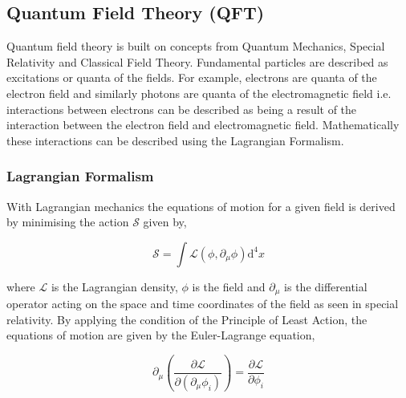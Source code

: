 \subsection{Quantum Field Theory (QFT)}

Quantum field theory is built on concepts from Quantum Mechanics, Special Relativity and Classical Field Theory. Fundamental particles are described as excitations or quanta of the fields. For example, electrons are quanta of the electron field and similarly photons are quanta of the electromagnetic field i.e. interactions between electrons can be described as being a result of the interaction between the electron field and electromagnetic field. Mathematically these interactions can be described using the Lagrangian Formalism. 

\subsubsection{Lagrangian Formalism}
With Lagrangian mechanics the equations of motion for a given field is derived by minimising the action $\mathcal{S}$ given by,

\begin{equation}
	\mathcal{S} = \int\mathcal{L}(\phi, \partial_\mu \phi) \mathrm{d}^4x
\end{equation}

where $\mathcal{L}$ is the Lagrangian density, $\phi$ is the field and $\partial_\mu$ is the differential operator acting on the space and time coordinates of the field as seen in special relativity. By applying the condition of the Principle of Least Action, the equations of motion are given by the Euler-Lagrange equation,

\begin{equation}
	\partial_\mu(\frac{\partial\mathcal{L}}{\partial(\partial_\mu\phi_i)}) = \frac{\partial\mathcal{L}}{\partial\phi_i}
\end{equation}



